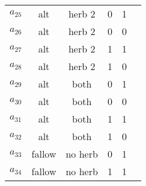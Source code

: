 \documentclass[12pt, a4paper]{article}
\begin{document}
\begin{longtable}[h]{c c c c c c}
	$a_{25}$ & alt & herb 2 & 0 & 1\\
	$a_{26}$ & alt & herb 2 & 0 & 0\\
	$a_{27}$ & alt & herb 2 & 1 & 1\\
	$a_{28}$ & alt & herb 2 & 1 & 0\\
	$a_{29}$ & alt & both & 0 & 1\\
	$a_{30}$ & alt & both & 0 & 0\\
	$a_{31}$ & alt & both & 1 & 1\\
	$a_{32}$ & alt & both & 1 & 0\\
	$a_{33}$ & fallow & no herb & 0 & 1\\
	$a_{34}$ & fallow & no herb & 1 & 1\\
	\hline
\end{longtable}
\end{document}
